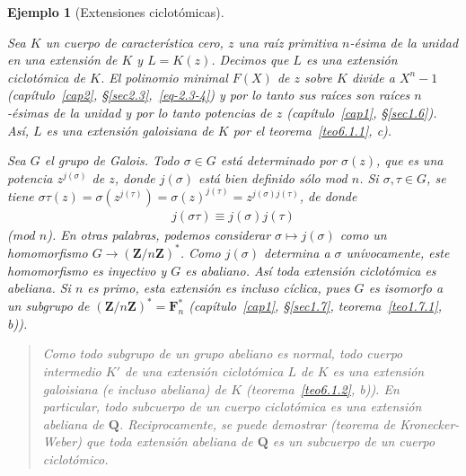 \documentclass[bibtotoc,leqno,spanish]{amsbook}
\newcommand{\QQ}{\mathbf{Q}}
\newcommand{\ZZ}{\mathbf{Z}}
\newcommand{\FF}{\mathbf{F}}
\renewcommand{\to}[1][]{\xrightarrow{#1}}
\numberwithin{equation}{section}
\newenvironment{comm}%
	{\begin{quotation}\itshape}
	{\end{quotation}}
\theoremstyle{note}
\theoremstyle{note}
\theoremstyle{rem}
\newtheorem{example}{Ejemplo}
\numberwithin{theorem}{section}
\numberwithin{proposition}{section}
\numberwithin{definition}{section}
\numberwithin{lemma}{section}
\numberwithin{corollary}{section}
\numberwithin{example}{section}
\numberwithin{footnote}{section}%
\begin{document}
\begin{example}[Extensiones ciclot\'omicas]\label{ej6.1.2}

Sea $K$ un cuerpo de caracter\'istica cero, $z$ una ra\'iz primitiva $n$-\'esima de
la unidad en una
extensi\'on de $K$ y $L=K(z)$. Decimos que $L$ es una extensi\'on {\em ciclot\'omica}
de $K$. El polinomio
minimal $F(X)$ de $z$ sobre $K$ divide a $X^{n}-1$
(cap\'itulo~\ref{cap2}, \S\ref{sec2.3},~\eqref{eq-2.3-4}) y por lo tanto
sus ra\'ices son ra\'ices $n$-\'esimas de la unidad y por lo tanto potencias
de $z$ (cap\'itulo~\ref{cap1}, \S\ref{sec1.6}).
As\'i, $L$ es una extensi\'on {\em galoisiana} de $K$ por el
teorema~\ref{teo6.1.1}, {\itshape c}).

Sea $G$ el grupo de Galois. Todo $\sigma\in G$ est\'a determinado por $\sigma(z)$,
que es una potencia
$z^{j(\sigma)}$ de $z$, donde $j(\sigma)$ est\'a bien definido s\'olo mod $n$.
Si $\sigma,\tau\in G$, se tiene
$\sigma\tau(z) = \sigma(z^{j(\tau)}) = \sigma(z)^{j(\tau)} = z^{j(\sigma)j(\tau)}$, de donde
\begin{gather*}
j(\sigma\tau) \equiv j(\sigma)j(\tau)
\end{gather*}
(mod $n$). En otras palabras, podemos considerar $\sigma\mapsto j(\sigma)$ como
un {\em homomorfismo}
$G\to(\ZZ/n\ZZ)^{*}$. Como $j(\sigma)$ determina a $\sigma$ un\'ivocamente, este
homomorfismo es {\em inyectivo}
y $G$ es abaliano. As\'i {\em toda extensi\'on ciclot\'omica es abeliana.} Si $n$ es
primo, esta extensi\'on
es incluso {\em c\'iclica,} pues $G$ es isomorfo a un subgrupo de
$(\ZZ/n\ZZ)^{*} = \FF_{n}^{*}$ (cap\'itulo~\ref{cap1},
\S\ref{sec1.7}, teorema~\ref{teo1.7.1}, {\itshape b})).
\end{example}

\begin{comm}
Como todo subgrupo de un grupo abeliano es normal, todo cuerpo intermedio $K'$ de
una extensi\'on ciclot\'omica
$L$ de $K$ es una extensi\'on galoisiana (e incluso abeliana) de $K$
(teorema~\ref{teo6.1.2}, {\itshape b})). En particular, todo
subcuerpo de un cuerpo ciclot\'omica es una extensi\'on abeliana de $\QQ$. Reciprocamente,
se puede
demostrar (teorema de Kronecker-Weber) que toda extensi\'on abeliana de $\QQ$ es un
subcuerpo de un cuerpo ciclot\'omico.
\end{comm}
\end{document}
